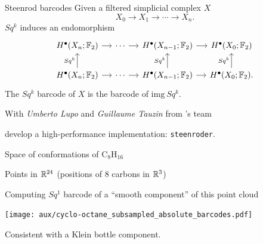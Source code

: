 \begin{frame}[fragile]{Steenrod barcodes} \pause
	Given a filtered simplicial complex $X$
	\[
	X_0 \to X_1 \to \cdots \to X_n.
	\]
	\pause
	$Sq^k$ induces an endomorphism
	\[
	\begin{tikzcd}[column sep = small]
	H^\bullet(X_n; \Ftwo) \arrow[r] & \cdots \arrow[r] & H^\bullet(X_{n-1}; \Ftwo) \arrow[r] & H^\bullet(X_0; \Ftwo) \\
	H^\bullet(X_n; \Ftwo) \arrow[u, "Sq^k"] \arrow[r] & \cdots \arrow[r] & H^\bullet(X_{n-1}; \Ftwo) \arrow[u, "Sq^k"] \arrow[r] & H^\bullet(X_0; \Ftwo) \arrow[u, "Sq^k"].
	\end{tikzcd}
	\]
	The \textcolor{pblue}{$Sq^k$ barcode} of $X$ is the barcode of $\mathrm{img}\ Sq^k$.

	\bigskip \pause

	With \textit{Umberto Lupo} and \textit{Guillaume Tauzin} from 's team

	\medskip
	develop a high-performance implementation: \textcolor{pblue}{\texttt{steenroder}}.
\end{frame}

\begin{frame}{Space of conformations of $\mathrm{C_8H_{16}}$}

	Points in $\mathbb{R}^{24}$ (positions of $8$ carbons in $\mathbb{R}^3$)

	\pause \smallskip

	Computing $Sq^1$ barcode of a ``smooth component'' of this point cloud

	\smallskip

	\texttt{[image: aux/cyclo-octane\_subsampled\_absolute\_barcodes.pdf]}

	Consistent with a \textcolor{pblue}{Klein bottle} component.
\end{frame}
